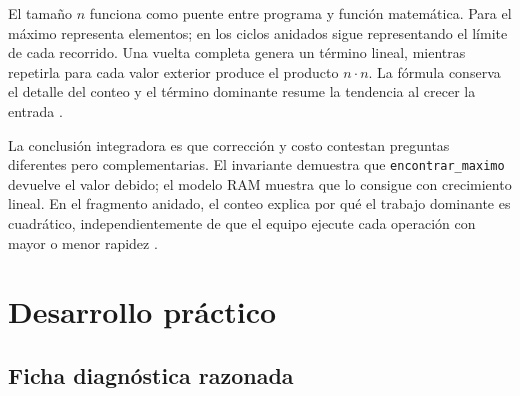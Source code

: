 \documentclass[12pt,letterpaper]{article}
\newcommand{\codigo}[1]{\texttt{#1}}
\begin{document}
El tamaño $n$ funciona como puente entre programa y función matemática. Para el máximo representa elementos; en los ciclos anidados sigue representando el límite de cada recorrido. Una vuelta completa genera un término lineal, mientras repetirla para cada valor exterior produce el producto $n\cdot n$. La fórmula conserva el detalle del conteo y el término dominante resume la tendencia al crecer la entrada \citep{cormen2022,sedgewick2011,knuth1976}.

La conclusión integradora es que corrección y costo contestan preguntas diferentes pero complementarias. El invariante demuestra que \codigo{encontrar\_maximo} devuelve el valor debido; el modelo RAM muestra que lo consigue con crecimiento lineal. En el fragmento anidado, el conteo explica por qué el trabajo dominante es cuadrático, independientemente de que el equipo ejecute cada operación con mayor o menor rapidez \citep{hoare1969,cook1973,skiena2020}.

\clearpage
\section{Desarrollo práctico}

\subsection{Ficha diagnóstica razonada}
\end{document}
